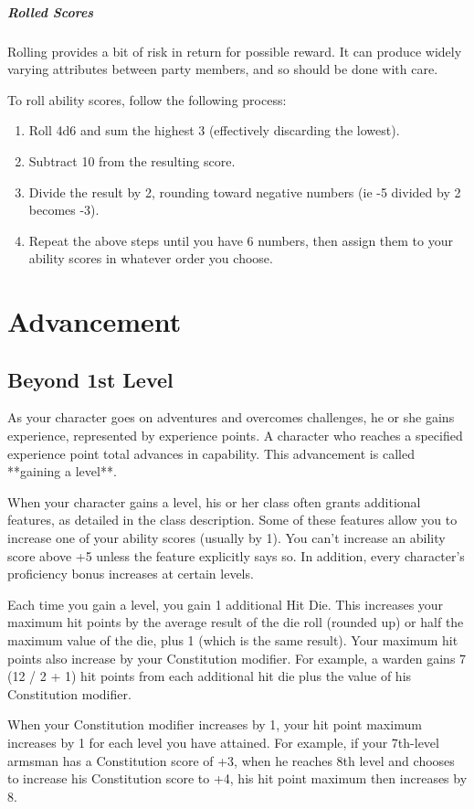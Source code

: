 \subparagraph*{Rolled Scores}
Rolling provides a bit of risk in return for possible reward. It can produce widely varying attributes between party members, and so should be done with care.

To roll ability scores, follow the following process:
\begin{enumerate}
	\item Roll 4d6 and sum the highest 3 (effectively discarding the lowest).
	\item Subtract 10 from the resulting score.
	\item Divide the result by 2, rounding toward negative numbers (ie -5 divided by 2 becomes -3).
	\item Repeat the above steps until you have 6 numbers, then assign them to your ability scores in whatever order you choose.
\end{enumerate}

\section{Advancement}\label{sec:advancement}
\subsection{Beyond 1st Level}\label{subsec:beyond-first-level}

As your character goes on adventures and overcomes challenges, he or she gains experience, represented by experience points. A character who reaches a specified experience point total advances in capability. This advancement is called **gaining a level**.

When your character gains a level, his or her class often grants additional features, as detailed in the class description. Some of these features allow you to increase one of your ability scores (usually by 1). You can't increase an ability score above +5 unless the feature explicitly says so. In addition, every character's proficiency bonus increases at certain levels.

Each time you gain a level, you gain 1 additional Hit Die. This increases your maximum hit points by the average result of the die roll (rounded up) or half the maximum value of the die, plus 1 (which is the same result). Your maximum hit points also increase by your Constitution modifier. For example, a warden gains 7 (12 / 2 + 1) hit points from each additional hit die plus the value of his Constitution modifier.

When your Constitution modifier increases by 1, your hit point maximum increases by 1 for each level you have attained. For example, if your 7th-level armsman has a Constitution score of +3, when he reaches 8th level and chooses to increase his Constitution score to +4, his hit point maximum then increases by 8.

